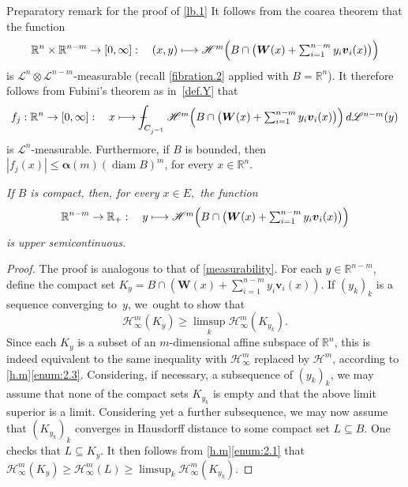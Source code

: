 \documentclass[JEP,XML,SOM,Unicode,ThmDefs,NoEqCountersInSection]{cedram}
\newcommand\mto{\mathchoice{\longmapsto}{\mapsto}{\mapsto}{\mapsto}}
\newenvironment{Empty}[2][\null]{%
\begin{enonce}[remark]{#1}#2}
{\end{enonce}}
\newcommand{\R}{\mathbb{R}}
\newcommand{\Rn}{\R^n}
\newcommand{\calH}{\mathscr{H}}
\newcommand{\calL}{\mathscr{L}}
\newcommand{\balpha}{\boldsymbol{\alpha}}
\newcommand{\bW}{{\boldsymbol{W}}}
\newcommand{\bv}{{\boldsymbol{v}}}
\DeclareMathOperator{\rmdiam}{\mathrm{diam}}
\def\Xint#1{\mathchoice
{\XXint\displaystyle\textstyle{#1}}{\XXint\textstyle\scriptstyle{#1}}{\XXint\scriptstyle\scriptscriptstyle{#1}}{\XXint\scriptscriptstyle
\scriptscriptstyle{#1}}\!\int}
\def\XXint#1#2#3{{\setbox0=\hbox{$#1{#2#3}{\int}$}
\vcenter{\hbox{$#2#3$}}\kern-.5\wd0}}
\def\dashint{\Xint-}
\let\subset\subseteq
\begin{document}
\begin{Empty}[Preparatory remark for the proof of \ref{lb.1}]
\label{rem.1}
It follows from the coarea theorem that the function
\begin{equation*}
\Rn \times \R^{n-m} \to [0,\infty]:\quad (x,y) \mto \textstyle\calH^m \Bigl(B \cap \bigl(\bW(x) + \sum_{i=1}^{n-m} y_i \bv_i(x) \bigr) \Bigr)
\end{equation*}
is $\calL^n \otimes \calL^{n-m}$-measurable (recall \ref{fibration.2} applied with $B = \Rn$).
It therefore follows from Fubini's theorem as in~\ref{def.Y} that
\begin{equation*}
f_j: \Rn \to [0,\infty]:\quad x \mto \dashint_{C_{j^{-1}}} \textstyle\calH^m \Bigl(B \cap \bigl(\bW(x) + \sum_{i=1}^{n-m} y_i \bv_i(x) \bigr) \Bigr) \,d\calL^{n-m}(y)
\end{equation*}
is $\calL^n$-measurable.
Furthermore, if $B$ is bounded, then $|f_j(x)| \leq \balpha(m) (\rmdiam B)^m$, for every $x \in \Rn$.
\end{Empty}

\begin{Empty}[]
\label{usc}
{\it
If $B$ is compact, then, for every $x \in E,$ the function
\begin{equation*}
\R^{n-m} \to \R_+:\quad y \mto \textstyle\calH^m \Bigl(B \cap \bigl(\bW(x) + \sum_{i=1}^{n-m} y_i \bv_i(x) \bigr) \Bigr)
\end{equation*}
is upper semicontinuous.
}
\end{Empty}

\begin{proof}
The proof is analogous to that of \ref{measurability}.
For each $y \in \R^{n-m}$, define the compact set $K_y \!=\! B \cap(\bW(x) + \sum_{i=1}^{n-m} y_i \bv_i(x))$.
If $(y_k)_k$ is a sequence converging to~$y$, we~ought to show that
\begin{equation*}
\calH^m_\infty(K_y) \geq \limsup_k \calH^m_\infty(K_{y_k}).
\end{equation*}
Since each $K_y$ is a subset of an $m$-dimensional affine subspace of $\Rn$, this is indeed equivalent to the same inequality with $\calH^m_\infty$ replaced by $\calH^m$, according to \ref{h.m}\eqref{enum:2.3}.
Considering, if necessary, a subsequence of $(y_k)_k$, we may assume that none of the compact sets $K_{y_k}$ is empty and that the above limit superior is a limit.
Considering yet a further subsequence, we may now assume that $(K_{y_k})_k$ converges in Hausdorff distance to some compact set $L \subset B$.
One checks that $L \subset K_y$.
It then follows from \ref{h.m}\eqref{enum:2.1} that $\calH^m_\infty \left(K_y\right) \geq \calH^m_\infty (L) \geq \limsup_k \calH^m_\infty \left(K_{y_k} \right)$.
\end{proof}
\end{document}
